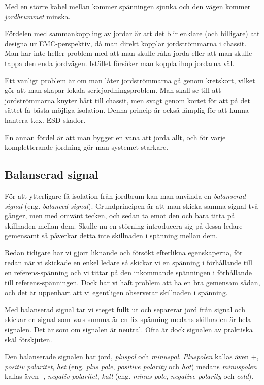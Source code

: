 Med en större kabel mellan kommer spänningen sjunka och den vägen kommer
\emph{jordbrummet} minska.

Fördelen med sammankoppling av jordar är att det blir enklare (och billigare)
att designa ur EMC-perspektiv, då man direkt kopplar jordströmmarna i chassit.
Man har inte heller problem med att man skulle råka jorda eller att man skulle
tappa den enda jordvägen. Istället försöker man koppla ihop jordarna väl.

Ett vanligt problem är om man låter jordströmmarna gå genom kretskort, vilket
gör att man skapar lokala seriejordningsproblem. Man skall se till att
jordströmmarna knyter hårt till chassit, men svagt genom kortet för att på det
sättet få bästa möjliga isolation. Denna princip är också lämplig för att
kunna hantera t.ex. ESD skador.

En annan fördel är att man bygger en vana att jorda allt, och för varje
kompletterande jordning gör man systemet starkare.

\subsection{Balanserad signal}

För att ytterligare få isolation från jordbrum kan man använda en
\emph{balanserad signal} (eng. \emph{balanced signal}). Grundprincipen är att
man skicka samma signal två gånger, men med omvänt tecken, och sedan ta emot
den och bara titta på skillnaden mellan dem. Skulle nu en störning introducera
sig på dessa ledare gemensamt så påverkar detta inte skillnaden i spänning
mellan dem.

Redan tidigare har vi gjort liknande och försökt efterlikna
egenskaperna, för redan när vi skickade en enkel ledare så skickar vi en
spänning i förhållande till en referens-spänning och vi tittar på den
inkommande spänningen i förhållande till referens-spänningen. Dock har vi haft
problem att ha en bra gemensam sådan, och det är uppenbart att vi egentligen
observerar skillnaden i spänning.

Med balanserad signal tar vi steget fullt ut och separerar jord från signal
och skickar en signal som vars summa är en fix spänning medans skillnaden är
hela signalen. Det är som om signalen är neutral. Ofta är dock signalen av
praktiska skäl förskjuten.

Den balanserade signalen har jord, \emph{pluspol} och \emph{minuspol}.
\emph{Pluspolen} kallas även +, \emph{positiv polaritet}, \emph{het} (eng.
\emph{plus pole}, \emph{positive polarity} och \emph{hot}) medans
\emph{minuspolen} kallas även -, \emph{negativ polaritet}, \emph{kall} (eng.
\emph{minus pole}, \emph{negative polarity} och \emph{cold}).

